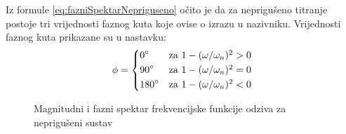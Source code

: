 Iz formule \eqref{eq:fazniSpektarNepriguseno} očito je da za neprigušeno titranje
postoje tri vrijednosti faznog kuta koje ovise o izrazu u nazivniku. Vrijednosti
faznog kuta prikazane su u nastavku:
\[
    \phi = \begin{dcases*}
            0\degree   & za $1-(\omega/\omega_n)^2 > 0$\\ %
            90\degree  & za $1-(\omega/\omega_n)^2 = 0$\\ %
            180\degree & za $1-(\omega/\omega_n)^2 < 0$\\ %
        \end{dcases*}
\]

\begin{figure}[H]
    \begin{subfigure}{1\textwidth}
        
    \end{subfigure}
    \vfill
    \begin{subfigure}{1\textwidth}
        
    \end{subfigure}
    \caption{Magnitudni i fazni spektar frekvencijske funkcije odziva za neprigušeni
    sustav}
    \label{fig:frf-nepriguseno}
\end{figure}
\newpage

